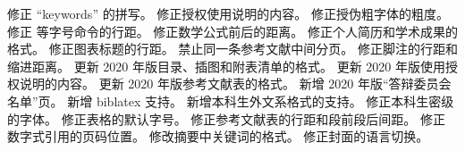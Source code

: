 {}\markdownRendererUlBegin
\markdownRendererUlItem 修正 “keywords” 的拼写。\markdownRendererUlItemEnd 
\markdownRendererUlItem 修正授权使用说明的内容。\markdownRendererUlItemEnd 
\markdownRendererUlItem 修正授伪粗字体的粗度。\markdownRendererUlItemEnd 
\markdownRendererUlItem 修正  等字号命令的行距。\markdownRendererUlItemEnd 
\markdownRendererUlItem 修正数学公式前后的距离。\markdownRendererUlItemEnd 
\markdownRendererUlItem 修正个人简历和学术成果的格式。\markdownRendererUlItemEnd 
\markdownRendererUlItem 修正图表标题的行距。\markdownRendererUlItemEnd 
\markdownRendererUlItem 禁止同一条参考文献中间分页。\markdownRendererUlItemEnd 
\markdownRendererUlItem 修正脚注的行距和缩进距离。\markdownRendererUlItemEnd 
\markdownRendererUlEnd \markdownRendererInterblockSeparator
{}\markdownRendererInterblockSeparator
{}\markdownRendererInterblockSeparator
{}\markdownRendererUlBegin
\markdownRendererUlItem 更新 2020 年版目录、插图和附表清单的格式。\markdownRendererUlItemEnd 
\markdownRendererUlItem 更新 2020 年版使用授权说明的内容。\markdownRendererUlItemEnd 
\markdownRendererUlItem 更新 2020 年版参考文献表的格式。\markdownRendererUlItemEnd 
\markdownRendererUlEnd \markdownRendererInterblockSeparator
{}\markdownRendererInterblockSeparator
{}\markdownRendererUlBegin
\markdownRendererUlItem 新增 2020 年版“答辩委员会名单”页。\markdownRendererUlItemEnd 
\markdownRendererUlItem 新增 biblatex 支持。\markdownRendererUlItemEnd 
\markdownRendererUlItem 新增本科生外文系格式的支持。\markdownRendererUlItemEnd 
\markdownRendererUlEnd \markdownRendererInterblockSeparator
{}\markdownRendererInterblockSeparator
{}\markdownRendererUlBegin
\markdownRendererUlItem 修正本科生密级的字体。\markdownRendererUlItemEnd 
\markdownRendererUlItem 修正表格的默认字号。\markdownRendererUlItemEnd 
\markdownRendererUlItem 修正参考文献表的行距和段前段后间距。\markdownRendererUlItemEnd 
\markdownRendererUlItem 修正  数字式引用的页码位置。\markdownRendererUlItemEnd 
\markdownRendererUlItem 修改摘要中关键词的格式。\markdownRendererUlItemEnd 
\markdownRendererUlItem 修正封面的语言切换。\markdownRendererUlItemEnd 
\markdownRendererUlEnd \markdownRendererInterblockSeparator
{}\markdownRendererInterblockSeparator
